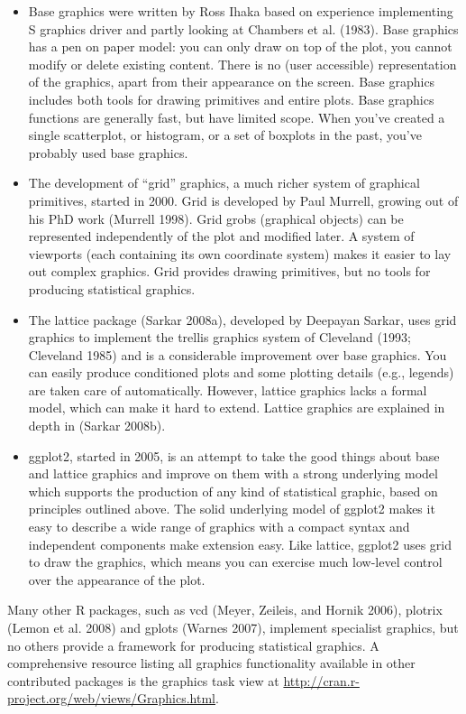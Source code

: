 \begin{itemize}
\item
  Base graphics were written by Ross Ihaka based on experience
  implementing S graphics driver and partly looking at Chambers et al.
  (1983). Base graphics has a pen on paper model: you can only draw on
  top of the plot, you cannot modify or delete existing content. There
  is no (user accessible) representation of the graphics, apart from
  their appearance on the screen. Base graphics includes both tools for
  drawing primitives and entire plots. Base graphics functions are
  generally fast, but have limited scope. When you've created a single
  scatterplot, or histogram, or a set of boxplots in the past, you've
  probably used base graphics.
\item
  The development of ``grid'' graphics, a much richer system of
  graphical primitives, started in 2000. Grid is developed by Paul
  Murrell, growing out of his PhD work (Murrell 1998). Grid grobs
  (graphical objects) can be represented independently of the plot and
  modified later. A system of viewports (each containing its own
  coordinate system) makes it easier to lay out complex graphics. Grid
  provides drawing primitives, but no tools for producing statistical
  graphics.
\item
  The lattice package (Sarkar 2008a), developed by Deepayan Sarkar, uses
  grid graphics to implement the trellis graphics system of Cleveland
  (1993; Cleveland 1985) and is a considerable improvement over base
  graphics. You can easily produce conditioned plots and some plotting
  details (e.g., legends) are taken care of automatically. However,
  lattice graphics lacks a formal model, which can make it hard to
  extend. Lattice graphics are explained in depth in (Sarkar 2008b).
\item
  ggplot2, started in 2005, is an attempt to take the good things about
  base and lattice graphics and improve on them with a strong underlying
  model which supports the production of any kind of statistical
  graphic, based on principles outlined above. The solid underlying
  model of ggplot2 makes it easy to describe a wide range of graphics
  with a compact syntax and independent components make extension easy.
  Like lattice, ggplot2 uses grid to draw the graphics, which means you
  can exercise much low-level control over the appearance of the plot.
\end{itemize}

Many other R packages, such as vcd (Meyer, Zeileis, and Hornik 2006),
plotrix (Lemon et al. 2008) and gplots (Warnes 2007), implement
specialist graphics, but no others provide a framework for producing
statistical graphics. A comprehensive resource listing all graphics
functionality available in other contributed packages is the graphics
task view at \url{http://cran.r-project.org/web/views/Graphics.html}.

